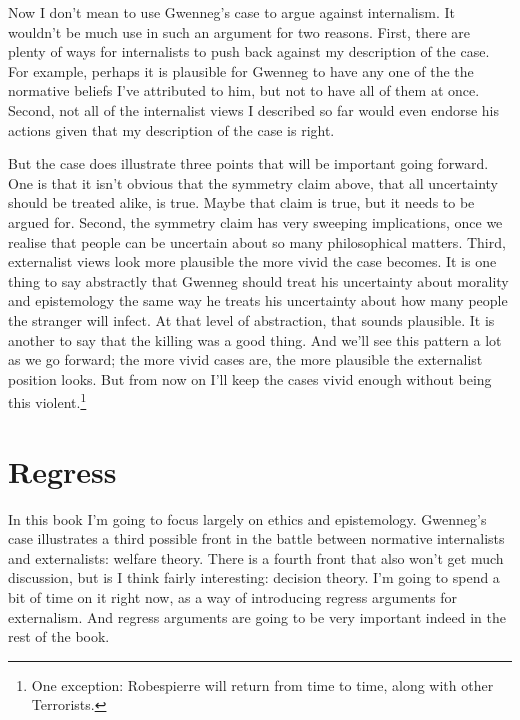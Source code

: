 Now I don't mean to use \gls{Gwenneg}'s case to argue against internalism. It wouldn't be much use in such an argument for two reasons. First, there are plenty of ways for internalists to push back against my description of the case. For example, perhaps it is plausible for \gls{Gwenneg} to have any one of the the normative beliefs I've attributed to him, but not to have all of them at once. Second, not all of the internalist views I described so far would even endorse his actions given that my description of the case is right.

But the case does illustrate three points that will be important going forward. One is that it isn't obvious that the symmetry claim above, that all uncertainty should be treated alike, is true. Maybe that claim is true, but it needs to be argued for. Second, the symmetry claim has very sweeping implications, once we realise that people can be uncertain about so many philosophical matters. Third, externalist views look more plausible the more vivid the case becomes. It is one thing to say abstractly that \gls{Gwenneg} should treat his uncertainty about morality and epistemology the same way he treats his uncertainty about how many people the stranger will infect. At that level of abstraction, that sounds plausible. It is another to say that the killing was a good thing. And we'll see this pattern a lot as we go forward; the more vivid cases are, the more plausible the externalist position looks. But from now on I'll keep the cases vivid enough without being this violent.\footnote{One exception: \gls{Robespierre} will return from time to time, along with other Terrorists.}

\section{Regress}
\label{regress}

In this book I'm going to focus largely on ethics and epistemology. \gls{Gwenneg}'s case illustrates a third possible front in the battle between normative internalists and externalists: welfare theory. There is a fourth front that also won't get much discussion, but is I think fairly interesting: decision theory. I'm going to spend a bit of time on it right now, as a way of introducing regress arguments for externalism. And regress arguments are going to be very important indeed in the rest of the book.

